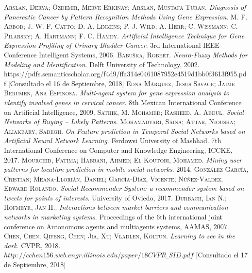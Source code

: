 \documentclass{article}
\begin{document}
\newpage
\begin{thebibliography}{99}
	\textsc{Arslan, Derya; \"Ozdemir, Merve Erkinay; Arslan, Mustafa Turan}. \textit{Diagnosis of Pancreatic Cancer by Pattern Recognition Methods Using Gene Expression}.
	 \textsc{M. F. Abbod; J. W. F. Catto; D. A. Linkens; P. J. Wild; A. Herr; C. Wissmann; C. Pilarsky; A. Hartmann; F. C. Hamdy}. \textit{Artificial Intelligence Technique for Gene Expression Profiling of Urinary Bladder Cancer}. 3rd International IEEE Conference Intelligent Systems, 2006.
	\textsc{Babu\v{s}ka, Robert}. \textit{Neuro-Fuzzy Methods for Modeling and Identification}. Delft University of Technology, 2002. https://pdfs.semanticscholar.org/f4d9/ffa314e0461087952e4519d1bb0f3613f955.pdf [Consultado el 16 de Septiembre, 2018]
	\textsc{Edna M\'arquez, Jes\'us Savage; Jaime Berumen, Ana Espinosa}. \textit{Multi-agent system for gene expression analysis to identify involved genes in cervical cancer}. 8th Mexican International Conference on Artificial Intelligence, 2009.
	\textsc{Sathik, M. Mohamed; Rasheed, A. Abdul}. \textit{Social Networks of Buying -- Likely Patterns}.
	 \textsc{Mohamadyari, Saina; Attar, Niousha; Aliakbary, Sadegh}. \textit{On Feature prediction in Temporal Social Networks based on Artificial Neural Network Learning}. Ferdowsi University of Mashhad. 7th International Conference on Computer and Knowledge Engineering, ICCKE, 2017.
	\textsc{Mourchid, Fatima; Habbani, Ahmed; El Koutobi, Mohamed}. \textit{Mining user patterns for location prediction in mobile social networks}. 2014.
	 \textsc{Gonz\'alez Garc\'ia, Cristian; Meana-Llori\'an, Daniel; Garc\'ia-D\'iaz, Vicente; N\'u\~{n}ez-Valdez, Edward Rolando}. \textit{Social Recommender System: a recommender system based on tweets for points of interests}. University of Oviedo, 2017.
	\textsc{Durbach, Ian N.; Hofmeyr, Jan H.}. \textit{Interactions between market barriers and communication networks in marketing systems}. Proceedings of the 6th international joint conference on Autonomous agents and multiagents systems, AAMAS, 2007.
	\textsc{Chen, Chen; Qifeng, Chen; Jia, Xu; Vladlen, Koltun}. \textit{Learning to see in the dark}. CVPR, 2018. $http://cchen156.web.engr.illinois.edu/paper/18CVPR\_SID.pdf$ [Consultado el 17 de Septiembre, 2018]

\end{thebibliography}
\end{document}
